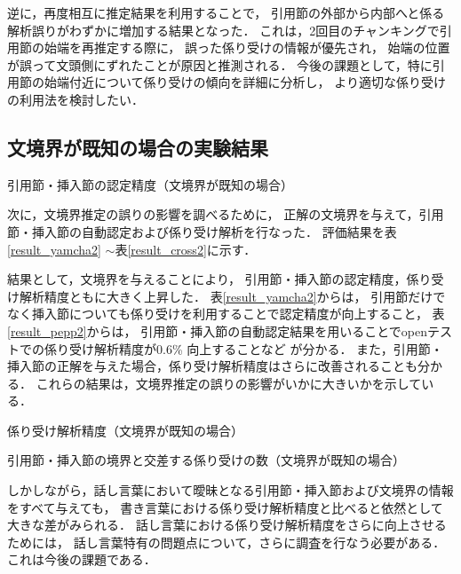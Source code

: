 \documentclass[japanese]{jnlp_1.4}
\begin{document}
逆に，再度相互に推定結果を利用することで，
引用節の外部から内部へと係る解析誤りがわずかに増加する結果となった．
これは，2回目のチャンキングで引用節の始端を再推定する際に，
誤った係り受けの情報が優先され，
始端の位置が誤って文頭側にずれたことが原因と推測される．
今後の課題として，特に引用節の始端付近について係り受けの傾向を詳細に分析し，
より適切な係り受けの利用法を検討したい．


\subsection{文境界が既知の場合の実験結果}\label{sec:known_sb}

\begin{table}[b]
\caption{引用節・挿入節の認定精度（文境界が既知の場合）}
\label{result_yamcha2}
\begin{center}

\end{center}
\end{table}

次に，文境界推定の誤りの影響を調べるために，
正解の文境界を与えて，引用節・挿入節の自動認定および係り受け解析を行なった．
評価結果を表\ref{result_yamcha2} $\sim$表\ref{result_cross2}に示す．

結果として，文境界を与えることにより，
引用節・挿入節の認定精度，係り受け解析精度ともに大きく上昇した．
表\ref{result_yamcha2}からは，
引用節だけでなく挿入節についても係り受けを利用することで認定精度が向上すること，
表\ref{result_pepp2}からは，
引用節・挿入節の自動認定結果を用いることでopenテストでの係り受け解析精度が0.6\% 向上することなど
が分かる．
また，引用節・挿入節の正解を与えた場合，係り受け解析精度はさらに改善されることも分かる．
これらの結果は，文境界推定の誤りの影響がいかに大きいかを示している．

\begin{table}[t]
\caption{係り受け解析精度（文境界が既知の場合）}
\label{result_pepp2}
\begin{center}

\end{center}
\end{table}
\begin{table}[t]
\caption{引用節・挿入節の境界と交差する係り受けの数（文境界が既知の場合）}
\label{result_cross2}
\begin{center}

\end{center}
\end{table}

しかしながら，話し言葉において曖昧となる引用節・挿入節および文境界の情報をすべて与えても，
書き言葉における係り受け解析精度と比べると依然として大きな差がみられる．
話し言葉における係り受け解析精度をさらに向上させるためには，
話し言葉特有の問題点について，さらに調査を行なう必要がある．
これは今後の課題である．
\end{document}
